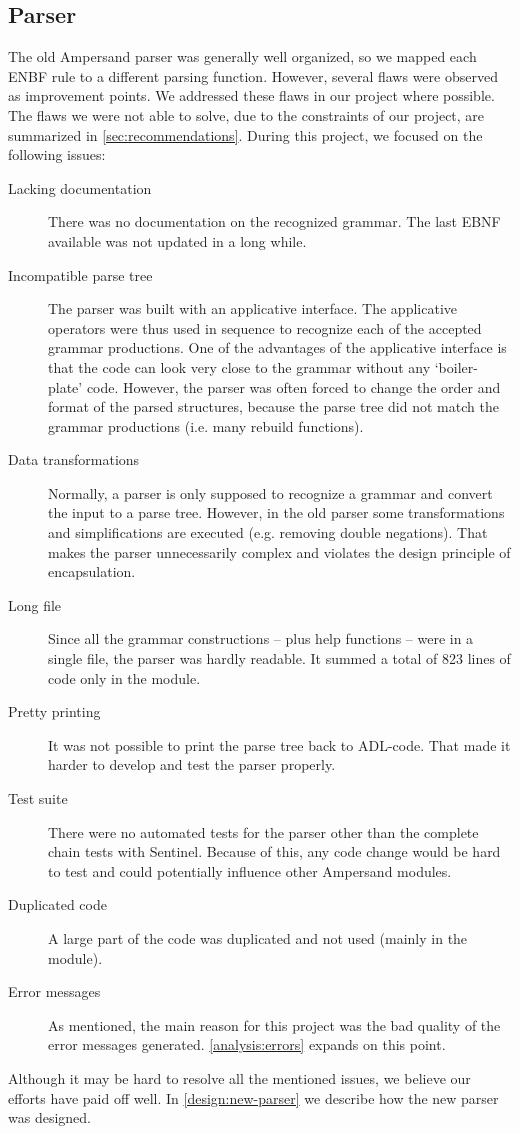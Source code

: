 
\subsection{Parser}
\label{analysis:parser}
The old Ampersand parser was generally well organized, so we mapped each ENBF rule to a different parsing function.
However, several flaws were observed as improvement points.
We addressed these flaws in our project where possible.
The flaws we were not able to solve, due to the constraints of our project, are summarized in \autoref{sec:recommendations}.
During this project, we focused on the following issues:
\begin{description}
  \item[Lacking documentation]
    There was no documentation on the recognized grammar.
    The last EBNF available was not updated in a long while.
  
  \item[Incompatible parse tree]
    The parser was built with an applicative interface.
    The applicative operators were thus used in sequence to recognize each of the accepted grammar productions.
    One of the advantages of the applicative interface is that the code can look very close to the grammar without any `boiler-plate' code.
    However, the parser was often forced to change the order and format of the parsed structures, because the parse tree did not match the grammar productions (i.e. many rebuild functions).
  
  \item[Data transformations]
    Normally, a parser is only supposed to recognize a grammar and convert the input to a parse tree.
    However, in the old parser some transformations and simplifications are executed (e.g. removing double negations).
    That makes the parser unnecessarily complex and violates the design principle of encapsulation.
  
  \item[Long file]
    Since all the grammar constructions -- plus help functions -- were in a single file, the parser was hardly readable.
    It summed a total of 823 lines of code only in the  module.
  
  \item[Pretty printing]
    It was not possible to print the parse tree back to ADL-code.
    That made it harder to develop and test the parser properly.
  
  \item[Test suite]
    There were no automated tests for the parser other than the complete chain tests with Sentinel.
    Because of this, any code change would be hard to test and could potentially influence other Ampersand modules.
  
  \item[Duplicated code]
    A large part of the code was duplicated and not used (mainly in the  module).
  
  \item[Error messages]
    As mentioned, the main reason for this project was the bad quality of the error messages generated.
    \autoref{analysis:errors} expands on this point.
\end{description}
%
Although it may be hard to resolve all the mentioned issues, we believe our efforts have paid off well.
In \autoref{design:new-parser} we describe how the new parser was designed.
